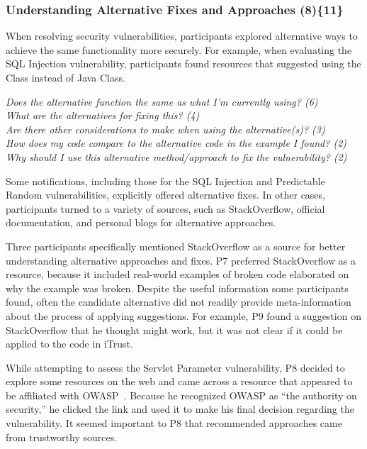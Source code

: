 \documentclass{acm_proc_article-sp}
\begin{document}

\subsubsection{\textbf{Understanding Alternative Fixes and Approaches (8)\{11\}}}\label{uafa}

When resolving security vulnerabilities, participants explored alternative ways to achieve the same functionality more securely.
For example, when evaluating the SQL Injection vulnerability, participants found resources that suggested using the  Class instead of Java  Class. 

\noindent\emph{Does the alternative function the same as what I'm currently using? (6)} \\
\emph{What are the alternatives for fixing this? (4)} \\
\emph{Are there other considerations to make when using the alternative(s)? (3)} \\
\emph{How does my code compare to the alternative code in the example I found? (2)} \\
\emph{Why should I use this alternative method/approach to fix the vulnerability? (2)} 

 
Some notifications, including those for the SQL Injection and Predictable Random vulnerabilities, explicitly offered alternative fixes. 
In other cases, participants turned to a variety of sources, such as StackOverflow, official documentation, and personal blogs for alternative approaches.
 
Three participants specifically mentioned StackOverflow as a source for better understanding alternative approaches and fixes. 
P7 preferred StackOverflow as a resource, because it included real-world examples of broken code elaborated on why the example was broken.
Despite the useful information some participants found, often the candidate alternative did not readily provide meta-information about the process of applying suggestions. 
For example, P9 found a suggestion on StackOverflow that he thought might work, but it was not clear if it could be applied to the code in iTrust.

While attempting to assess the Servlet Parameter vulnerability, P8 decided to explore some resources on the web and came across a resource that appeared to be affiliated with OWASP~\cite{OWASP}. 
Because he recognized OWASP as ``the authority on security,'' he clicked the link and used it to make his final decision regarding the vulnerability. 
It seemed important to P8 that recommended approaches came from trustworthy sources.
\end{document}
